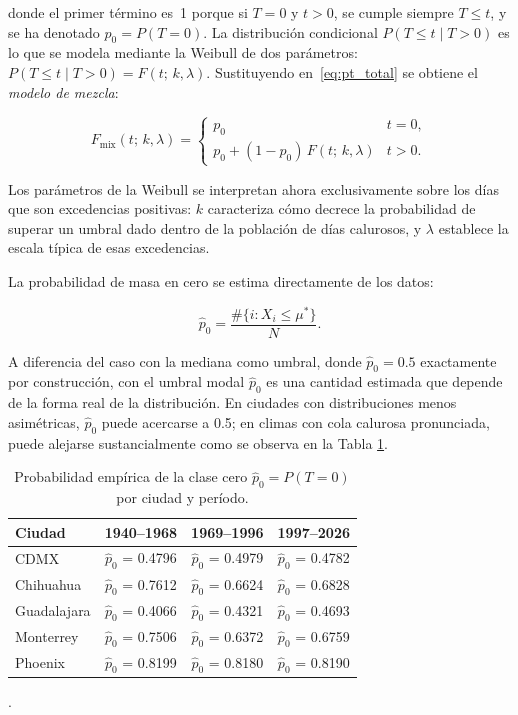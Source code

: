 \documentclass[APA,STIX1COL]{WileyNJD-v2}
\begin{document}
{\medskip

donde el primer t\'ermino es~1 porque si $T=0$ y $t>0$, se
cumple siempre $T\leq t$, y se ha denotado $p_0=P(T=0)$.
La distribuci\'on condicional $P(T\leq t\mid T>0)$ es lo que
se modela mediante la Weibull de dos par\'ametros:
$P(T\leq t\mid T>0)=F(t;\,k,\lambda)$.
Sustituyendo en~\eqref{eq:pt_total} se obtiene el
\emph{modelo de mezcla}:

\begin{equation}\label{eq:mezcla}
F_{\mathrm{mix}}(t;\,k,\lambda)
  = \begin{cases}
    p_0 & t=0,\\[6pt]
    p_0 + (1-p_0)\,F(t;\,k,\lambda) & t>0.
    \end{cases}
\end{equation}

\medskip

Los par\'ametros de la Weibull se interpretan ahora
exclusivamente sobre los d\'ias que son excedencias positivas:
$k$ caracteriza c\'omo decrece la probabilidad de superar un
umbral dado dentro de la poblaci\'on de d\'ias calurosos,
y $\lambda$ establece la escala t\'ipica de esas excedencias.

\medskip

La probabilidad de masa en cero se estima directamente de
los datos:

\begin{equation}\label{eq:p0}
\hat{p}_0
  = \frac{\#\{i : X_i\leq\mu^*\}}{N}.
\end{equation}

\medskip

A diferencia del caso con la mediana como umbral, donde
$\hat{p}_0=0.5$ exactamente por construcci\'on, con el umbral
modal $\hat{p}_0$ es una cantidad estimada que depende de la forma real de la distribuci\'on. En ciudades con
distribuciones menos asim\'etricas, $\hat{p}_0$ puede acercarse
a 0.5; en climas con cola calurosa pronunciada, puede alejarse
sustancialmente como se observa en la Tabla \ref{tab:p0}.

\begin{table}[ht]
\centering
\begin{tabular}{lccc}
\toprule
Ciudad       & 1940--1968 & 1969--1996 & 1997--2026 \\
\midrule
CDMX         & $\hat{p}_0$ = 0.4796  & $\hat{p}_0$ = 0.4979 & $\hat{p}_0$ = 0.4782 \\
Chihuahua    & $\hat{p}_0$ = 0.7612  & $\hat{p}_0$ = 0.6624 & $\hat{p}_0$ = 0.6828 \\
Guadalajara  & $\hat{p}_0$ = 0.4066 & $\hat{p}_0$ = 0.4321 & $\hat{p}_0$ = 0.4693 \\
Monterrey    & $\hat{p}_0$ = 0.7506 & $\hat{p}_0$ = 0.6372 & $\hat{p}_0$ = 0.6759 \\
Phoenix      & $\hat{p}_0$ = 0.8199 & $\hat{p}_0$ = 0.8180 & $\hat{p}_0$ = 0.8190 \\
\bottomrule
\end{tabular}
\caption{Probabilidad empírica de la clase cero $\hat{p}_0 = P(T=0)$
por ciudad y período.}
\label{tab:p0}
\end{table}.

}
\end{document}
